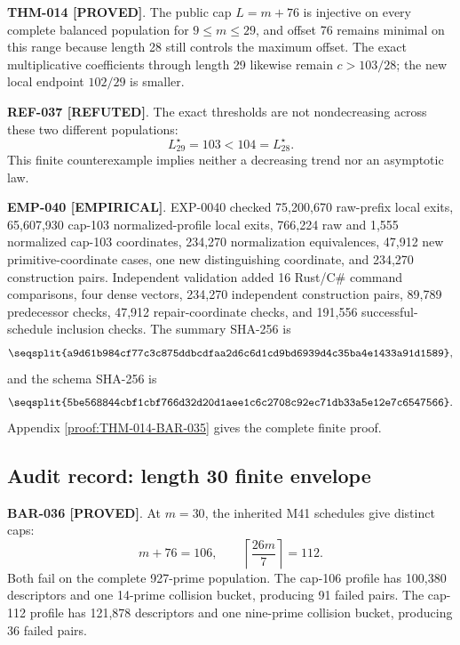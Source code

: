 \documentclass[11pt]{article}
\newcommand{\claimstatus}[2]{\textbf{#1 [#2]}}
\begin{document}
\claimstatus{THM-014}{PROVED}. The public cap \(L=m+76\) is injective on
every complete balanced population for \(9\le m\le29\), and offset 76
remains minimal on this range because length 28 still controls the maximum
offset. The exact multiplicative coefficients through length 29 likewise
remain \(c>103/28\); the new local endpoint \(102/29\) is smaller.

\claimstatus{REF-037}{REFUTED}. The exact thresholds are not nondecreasing
across these two different populations:
\[
L_{29}^{\star}=103<104=L_{28}^{\star}.
\]
This finite counterexample implies neither a decreasing trend nor an
asymptotic law.

\claimstatus{EMP-040}{EMPIRICAL}. EXP-0040 checked 75,200,670 raw-prefix
local exits, 65,607,930 cap-103 normalized-profile local exits, 766,224 raw
and 1,555 normalized cap-103 coordinates, 234,270 normalization
equivalences, 47,912 new primitive-coordinate cases, one new distinguishing
coordinate, and 234,270 construction pairs. Independent validation added
16 Rust/C\# command comparisons, four dense vectors, 234,270 independent
construction pairs, 89,789 predecessor checks, 47,912 repair-coordinate
checks, and 191,556 successful-schedule inclusion checks. The summary
SHA-256 is
\[
\texttt{\seqsplit{a9d61b984cf77c3c875ddbcdfaa2d6c6d1cd9bd6939d4c35ba4e1433a91d1589}},
\]
and the schema SHA-256 is
\[
\texttt{\seqsplit{5be568844cbf1cbf766d32d20d1aee1c6c2708c92ec71db33a5e12e7c6547566}}.
\]
Appendix \ref{proof:THM-014-BAR-035} gives the complete finite proof.

\subsection{Audit record: length 30 finite envelope}

\claimstatus{BAR-036}{PROVED}. At \(m=30\), the inherited M41 schedules give
distinct caps:
\[
m+76=106,\qquad
\left\lceil\frac{26m}{7}\right\rceil=112.
\]
Both fail on the complete 927-prime population. The cap-106 profile has
100,380 descriptors and one 14-prime collision bucket, producing 91 failed
pairs. The cap-112 profile has 121,878 descriptors and one nine-prime
collision bucket, producing 36 failed pairs.
\end{document}

